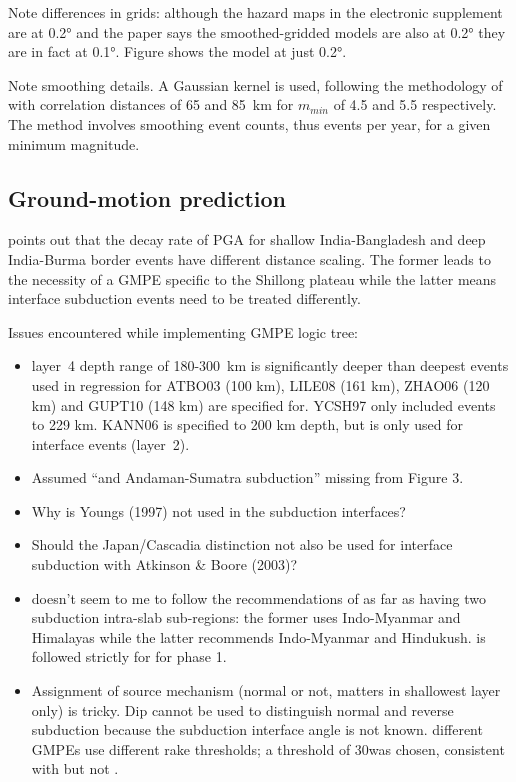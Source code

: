 \documentclass{article}
\begin{document}
Note differences in grids: although the hazard maps in the electronic supplement are at 0.2° and the paper says the smoothed-gridded models are also at 0.2° they are in fact at 0.1°. Figure shows the model at just 0.2°.

Note smoothing details. A Gaussian kernel is used, following the methodology of \cite{frankel1995mapping} with correlation distances of 65 and 85~km for $m_{min}$ of 4.5 and 5.5 respectively. The method involves smoothing event counts, thus events per year, for a given minimum magnitude.

\cite{thingbaijam2011synoptic}

\subsection{Ground-motion prediction}
\label{sec:GroundMotion}

\cite{sharma2009ground} points out that the decay rate of PGA for shallow India-Bangladesh and deep India-Burma border events have different distance scaling. The former leads to the necessity of a GMPE specific to the Shillong plateau \cite{nath2012ground} while the latter means interface subduction events need to be treated differently. 

Issues encountered while implementing GMPE logic tree:
\begin{itemize}
\item layer~4 depth range of 180-300~km is significantly deeper than deepest events used in regression for ATBO03 (100 km), LILE08 (161 km), ZHAO06 (120 km) and GUPT10 (148 km) are specified for. YCSH97 only included events to 229 km. KANN06 is specified to 200 km depth, but is only used for interface events (layer~2).
\item Assumed “and Andaman-Sumatra subduction” missing from Figure 3.
\item Why is Youngs (1997) not used in the subduction interfaces?
\item Should the Japan/Cascadia distinction not also be used for interface subduction with Atkinson \& Boore (2003)?
\item \cite{nath2012probabilistic} doesn't seem to me to follow the recommendations of \cite{nath2011peak} as far as having two subduction intra-slab sub-regions: the former uses Indo-Myanmar and Himalayas while the latter recommends Indo-Myanmar and Hindukush. \cite{nath2012probabilistic} is followed strictly for for phase 1.
\item Assignment of source mechanism (normal or not, matters in shallowest layer only) is tricky.  Dip cannot be used to distinguish normal and reverse subduction because the subduction interface angle is not known. different GMPEs use different rake thresholds; a threshold of 30\degree\space was chosen, consistent with \cite{boore2008ground, campbell2008nga} but not \cite{zhao2006attenuation}.
\end{itemize}
\end{document}
